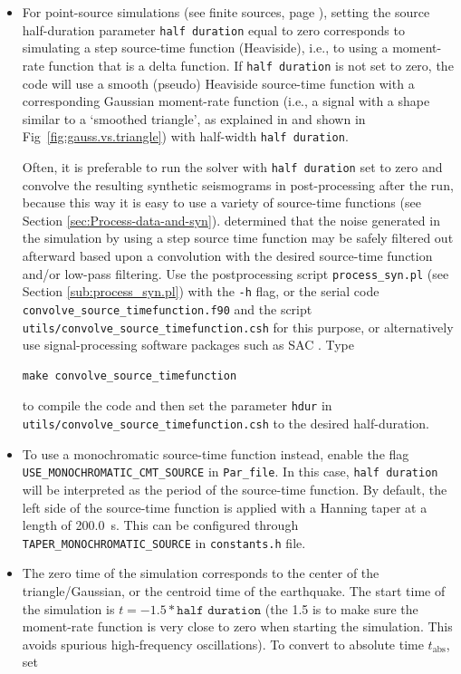 \begin{itemize}
\item For point-source simulations (see finite sources, page \pageref{To-simulate-a}),
setting the source half-duration parameter \texttt{half duration} equal to zero corresponds to simulating a step source-time
function (Heaviside), i.e., to using a moment-rate function that is a delta function. If
\texttt{half duration} is not set to zero, the code will use a smooth (pseudo) Heaviside source-time function
with a corresponding Gaussian moment-rate function
(i.e., a signal with a shape similar to a `smoothed triangle', as
explained in \citet{KoTr02a} and shown in Fig~\ref{fig:gauss.vs.triangle})
with half-width \texttt{half duration}.

Often, it is preferable to run the solver with \texttt{half duration} set to zero and convolve
the resulting synthetic seismograms in post-processing after the run,
because this way it is easy to use a variety of source-time functions
(see Section \ref{sec:Process-data-and-syn}). \citet{KoTr02a} determined
that the noise generated in the simulation by using a step source
time function may be safely filtered out afterward based upon a convolution
with the desired source-time function and/or low-pass filtering. Use
the postprocessing script \texttt{process\_syn.pl} (see Section \ref{sub:process_syn.pl})
with the \texttt{-h} flag, or the serial code \texttt{convolve\_source\_timefunction.f90}
and the script \texttt{utils/convolve\_source\_timefunction.csh} for
this purpose, or alternatively use signal-processing software packages
such as SAC . Type
\begin{verbatim}
make convolve_source_timefunction
\end{verbatim}
to compile the code and then set the parameter \texttt{hdur} in \texttt{utils/convolve\_source\_timefunction.csh}
to the desired half-duration.

\item To use a monochromatic source-time function instead, enable the flag \texttt{USE\_MONOCHROMATIC\_CMT\_SOURCE} in \texttt{Par\_file}. In this case, \texttt{half
duration} will be interpreted as the period of the source-time function. By default, the left side of the source-time function is applied with a Hanning taper at a length of 200.0~s. This can be configured through \texttt{TAPER\_MONOCHROMATIC\_SOURCE} in \texttt{constants.h} file.

\item The zero time of the simulation corresponds to the center of the triangle/Gaussian,
or the centroid time of the earthquake. The start time of the simulation
is $t=-1.5*\texttt{half duration}$ (the 1.5 is to make sure the moment-rate function is very close to zero
when starting the simulation. This avoids spurious high-frequency oscillations).
To convert to absolute time $t_{\mathrm{abs}}$, set


\end{itemize}
